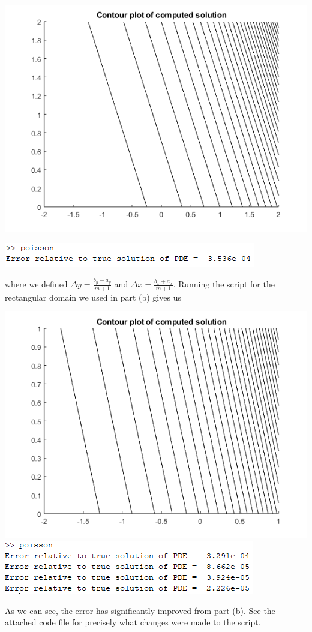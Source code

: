 \documentclass{article}
\begin{document}
\begin{center}
    \includegraphics[scale = 0.6]{deltaydeltax.png}

    \includegraphics[scale = 0.8]{deltaydeltaxerror.PNG}
\end{center}
where we defined $\Delta y = \frac{b_y - a_y}{m + 1}$ and $\Delta x = \frac{b_x + a_x}{m + 1}$. Running the script for the rectangular domain we used in part (b) gives us
\begin{center}
    \includegraphics[scale = 0.6]{unevengrid.png}
    \includegraphics[scale = 0.8]{unevengriderr.PNG}
\end{center}
As we can see, the error has significantly improved from part (b). See the attached code file for precisely what changes were made to the script.
\newline
\end{document}
